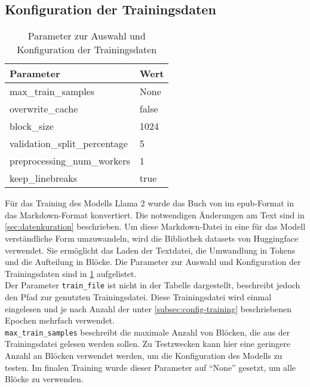 \subsection{Konfiguration der Trainingsdaten}
\begin{table}
    \centering
    \begin{tabular}{ll}
        \toprule
        \textbf{Parameter}            & \textbf{Wert} \\
        \midrule
        max\_train\_samples           & None          \\
        overwrite\_cache              & false         \\
        block\_size                   & 1024          \\
        validation\_split\_percentage & 5             \\
        preprocessing\_num\_workers   & 1             \\
        keep\_linebreaks              & true          \\
        \bottomrule
    \end{tabular}
    \caption{Parameter zur Auswahl und Konfiguration der Trainingsdaten}\label{tab:data-config}
\end{table}
Für das Training des Modells Llama 2 wurde das Buch  von \citet{bb} im epub-Format in das Markdown-Format konvertiert.
Die notwendigen Änderungen am Text sind in \cref{sec:datenkuration} beschrieben.
Um diese Markdown-Datei in eine für das Modell verständliche Form umzuwandeln, wird die Bibliothek datasets \citep{datasets} von Huggingface verwendet.
Sie ermöglicht das Laden der Textdatei, die Umwandlung in Tokens und die Aufteilung in Blöcke.
Die Parameter zur Auswahl und Konfiguration der Trainingsdaten sind in \cref{tab:data-config} aufgelistet.\\

Der Parameter \texttt{train\_file} ist nicht in der Tabelle dargestellt, beschreibt jedoch den Pfad zur genutzten Trainingsdatei.
Diese Trainingsdatei wird einmal eingelesen und je nach Anzahl der unter \cref{subsec:config-training} beschriebenen Epochen mehrfach verwendet.\\

\texttt{max\_train\_samples} beschreibt die maximale Anzahl von Blöcken, die aus der Trainingsdatei gelesen werden sollen.
Zu Testzwecken kann hier eine geringere Anzahl an Blöcken verwendet werden, um die Konfiguration des Modells zu testen.
Im finalen Training wurde dieser Parameter auf \enquote{None} gesetzt, um alle Blöcke zu verwenden.\\

